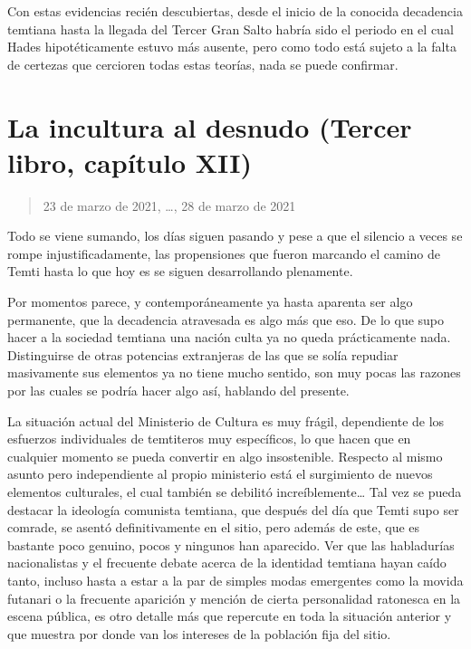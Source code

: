 \documentclass[
  spanish,
]{book}
\begin{document}
Con estas evidencias recién descubiertas, desde el inicio de la conocida decadencia temtiana hasta la llegada del Tercer Gran Salto habría sido el periodo en el cual Hades hipotéticamente estuvo más ausente, pero como todo está sujeto a la falta de certezas que cercioren todas estas teorías, nada se puede confirmar.

\hypertarget{la-incultura-al-desnudo-tercer-libro-capuxedtulo-xii}{%
\section{La incultura al desnudo (Tercer libro, capítulo XII)}\label{la-incultura-al-desnudo-tercer-libro-capuxedtulo-xii}}

\begin{quote}
23 de marzo de 2021, \ldots, 28 de marzo de 2021
\end{quote}

Todo se viene sumando, los días siguen pasando y pese a que el silencio a veces se rompe injustificadamente, las propensiones que fueron marcando el camino de Temti hasta lo que hoy es se siguen desarrollando plenamente.

Por momentos parece, y contemporáneamente ya hasta aparenta ser algo permanente, que la decadencia atravesada es algo más que eso. De lo que supo hacer a la sociedad temtiana una nación culta ya no queda prácticamente nada. Distinguirse de otras potencias extranjeras de las que se solía repudiar masivamente sus elementos ya no tiene mucho sentido, son muy pocas las razones por las cuales se podría hacer algo así, hablando del presente.

La situación actual del Ministerio de Cultura es muy frágil, dependiente de los esfuerzos individuales de temtiteros muy específicos, lo que hacen que en cualquier momento se pueda convertir en algo insostenible. Respecto al mismo asunto pero independiente al propio ministerio está el surgimiento de nuevos elementos culturales, el cual también se debilitó increíblemente\ldots{} Tal vez se pueda destacar la ideología comunista temtiana, que después del día que Temti supo ser comrade, se asentó definitivamente en el sitio, pero además de este, que es bastante poco genuino, pocos y ningunos han aparecido. Ver que las habladurías nacionalistas y el frecuente debate acerca de la identidad temtiana hayan caído tanto, incluso hasta a estar a la par de simples modas emergentes como la movida futanari o la frecuente aparición y mención de cierta personalidad ratonesca en la escena pública, es otro detalle más que repercute en toda la situación anterior y que muestra por donde van los intereses de la población fija del sitio.
\end{document}
